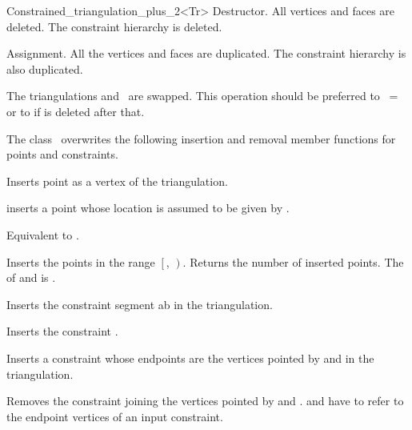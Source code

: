 \begin{ccRefClass}{Constrained_triangulation_plus_2<Tr>}
{Destructor. All vertices and faces are deleted.
The constraint hierarchy is deleted.}




{Assignment. All the vertices and faces are duplicated.
 The constraint hierarchy is also duplicated.}

{The triangulations  and \ccVar\ are swapped.
This operation should be preferred to \ccVar\ =  or to
 if  is deleted after that.}

The class \ccRefName\ overwrites the following insertion and removal
member functions for points and constraints.

{Inserts point  as a vertex of the triangulation.}

{inserts a point  whose location is assumed 
to be given by .}

{Equivalent to .}

{Inserts the points in the range
 $\left[\right.$, $\left.\right)$.
 Returns the number of inserted points.
 \ccPrecond The  of  and 
 is .}

{Inserts the constraint segment ab in the triangulation. }

{Inserts the constraint .}

{ Inserts a constraint whose endpoints are the vertices 
pointed by  and 
in the triangulation. }

{Removes the constraint  joining the vertices pointed by  and .
\ccPrecond {} and  have to refer to  the endpoint vertices
of an  input constraint.}



\end{ccRefClass}
